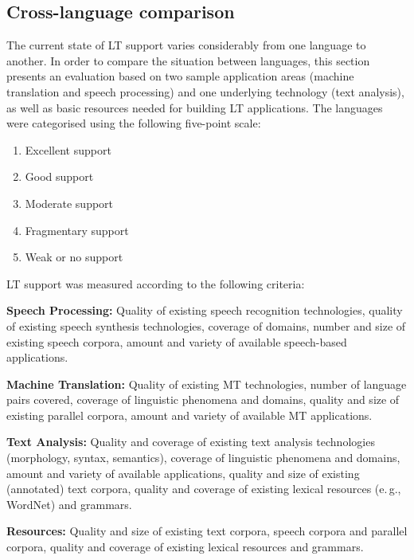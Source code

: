 \begin{multicols}{2}

\subsection{Cross-language comparison}

The current state of LT support varies considerably from one language to another. In order to compare the situation between languages, this section presents an evaluation based on two sample application areas (machine translation and speech processing) and one underlying technology (text analysis), as well as basic resources needed for building LT applications. The languages were categorised using the following five-point scale: 

\begin{enumerate}
\item Excellent support
\item Good support
\item Moderate support
\item Fragmentary support
\item Weak or no support
\end{enumerate}

LT support was measured according to the following criteria:

\textbf{Speech Processing:} Quality of existing speech recognition technologies, quality of existing speech synthesis technologies, coverage of domains, number and size of existing speech corpora, amount and variety of available speech-based applications.

\textbf{Machine Translation:} Quality of existing MT technologies, number of language pairs covered, coverage of linguistic phenomena and domains, quality and size of existing parallel corpora, amount and variety of available MT applications.

\textbf{Text Analysis:} Quality and coverage of existing text analysis technologies (morphology, syntax, semantics), coverage of linguistic phenomena and domains, amount and variety of available applications, quality and size of existing (annotated) text corpora, quality and coverage of existing lexical resources (e.\,g., WordNet) and grammars.

\textbf{Resources:} Quality and size of existing text corpora, speech corpora and parallel corpora, quality and coverage of existing lexical resources and grammars.


\end{multicols}
